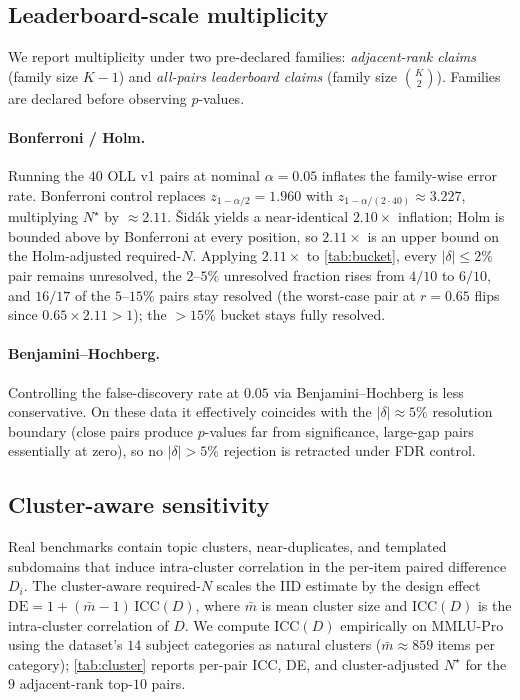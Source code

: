 \documentclass{article}
\theoremstyle{plain}
\theoremstyle{definition}
\begin{document}
\subsection{Leaderboard-scale multiplicity}
\label{sec:multiplicity}

We report multiplicity under two pre-declared families: \emph{adjacent-rank claims} (family size $K{-}1$) and \emph{all-pairs leaderboard claims} (family size $\binom{K}{2}$). Families are declared before observing $p$-values.

\paragraph{Bonferroni / Holm.} Running the $40$ OLL v1 pairs at nominal $\alpha=0.05$ inflates the family-wise error rate. Bonferroni control replaces $z_{1-\alpha/2}=1.960$ with $z_{1-\alpha/(2\cdot 40)}\approx 3.227$, multiplying $N^{\star}$ by ${\approx}2.11$. \v{S}id\'ak yields a near-identical $2.10\times$ inflation; Holm \citep{holm1979simple} is bounded above by Bonferroni at every position, so $2.11\times$ is an upper bound on the Holm-adjusted required-$N$. Applying $2.11\times$ to \cref{tab:bucket}, every $|\delta|\leq 2\%$ pair remains unresolved, the $2$--$5\%$ unresolved fraction rises from $4/10$ to $6/10$, and $16/17$ of the $5$--$15\%$ pairs stay resolved (the worst-case pair at $r{=}0.65$ flips since $0.65{\times}2.11{>}1$); the $>\!15\%$ bucket stays fully resolved.

\paragraph{Benjamini--Hochberg.} Controlling the false-discovery rate at $0.05$ via Benjamini--Hochberg \citep{benjamini1995controlling} is less conservative. On these data it effectively coincides with the $|\delta|\approx 5\%$ resolution boundary (close pairs produce $p$-values far from significance, large-gap pairs essentially at zero), so no $|\delta|>5\%$ rejection is retracted under FDR control.

\subsection{Cluster-aware sensitivity}
\label{sec:cluster}

Real benchmarks contain topic clusters, near-duplicates, and templated subdomains \citep{madaan2024variance,jo2025whatdoes} that induce intra-cluster correlation in the per-item paired difference $D_i$. The cluster-aware required-$N$ scales the IID estimate by the design effect $\mathrm{DE} = 1 + (\bar m - 1)\,\mathrm{ICC}(D)$, where $\bar m$ is mean cluster size and $\mathrm{ICC}(D)$ is the intra-cluster correlation of $D$. We compute $\mathrm{ICC}(D)$ empirically on MMLU-Pro using the dataset's $14$ subject categories \citep{madaan2024variance} as natural clusters ($\bar m \approx 859$ items per category); \cref{tab:cluster} reports per-pair ICC, DE, and cluster-adjusted $N^{\star}$ for the $9$ adjacent-rank top-$10$ pairs.
\end{document}
